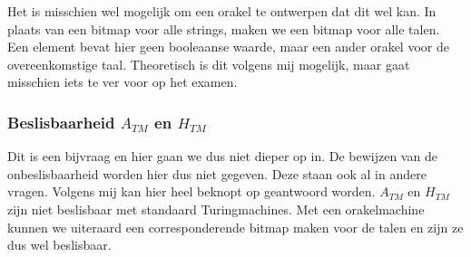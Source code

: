 Het is misschien wel mogelijk om een orakel te ontwerpen dat dit wel kan. In plaats van een bitmap voor alle strings, maken we een bitmap voor alle talen. Een element bevat hier geen booleaanse waarde, maar een ander orakel voor de overeenkomstige taal. Theoretisch is dit volgens mij mogelijk, maar gaat misschien iets te ver voor op het examen.

\subsubsection*{Beslisbaarheid $A_{TM}$ en $H_{TM}$}

Dit is een bijvraag en hier gaan we dus niet dieper op in. De bewijzen van de onbeslisbaarheid worden hier dus niet gegeven. Deze staan ook al in andere vragen. Volgens mij kan hier heel beknopt op geantwoord worden. $A_{TM}$ en $H_{TM}$ zijn niet beslisbaar met standaard Turingmachines. Met een orakelmachine kunnen we uiteraard een corresponderende bitmap maken voor de talen en zijn ze dus wel beslisbaar.